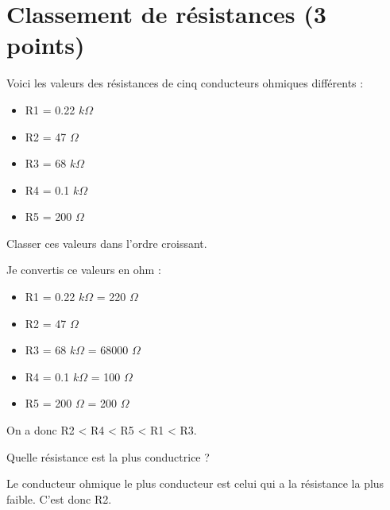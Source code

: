 \section{Classement de résistances (3 points)}

Voici les valeurs des résistances de cinq conducteurs ohmiques différents :
\begin{multicols}{2}
	\begin{itemize}
	\item R1 = \num{0.22} $k\Omega$
	\item R2 = \num{47} $\Omega$
	\item R3 = \num{68} $k\Omega$
	\item R4 = \num{0.1} $k\Omega$
	\item R5 = \num{200} $\Omega$
\end{itemize}
\end{multicols}

\begin{questions}
	\question Classer ces valeurs dans l’ordre croissant.
		\begin{solution}
		Je convertis ce valeurs en ohm :
		\begin{multicols}{2}
			\begin{itemize}
				\item R1 = \num{0.22} $k\Omega$ = 220 $\Omega$
				\item R2 = \num{47} $\Omega$ 
				\item R3 = \num{68} $k\Omega$ = \num{68000} $\Omega$
				\item R4 = \num{0.1} $k\Omega$ = 100 $\Omega$
				\item R5 = \num{200} $\Omega$ = 200 $\Omega$
			\end{itemize}
		\end{multicols}
		On a donc R2 < R4 < R5 < R1 < R3.
	\end{solution}
	\question Quelle résistance est la plus conductrice ?
	\begin{solution}
		Le conducteur ohmique le plus conducteur est celui qui a la résistance la plus faible. C'est donc R2.
	\end{solution}
	 
\end{questions}